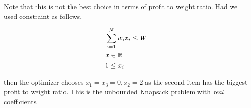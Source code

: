 Note that this is not the best choice in terms of profit to weight ratio. Had we used constraint as follows,

\begin{align*}
  & \sum_{i=1}^N w_i x_i \leq W \\
  & x \in \mathbb{R} \\
  & 0 \leq x_i
\end{align*}

then the optimizer chooses $x_1 = x_3 = 0, x_2 = 2$ as the second item has the biggest profit to weight ratio. This is the unbounded Knapsack problem with \emph{real} coefficients.



